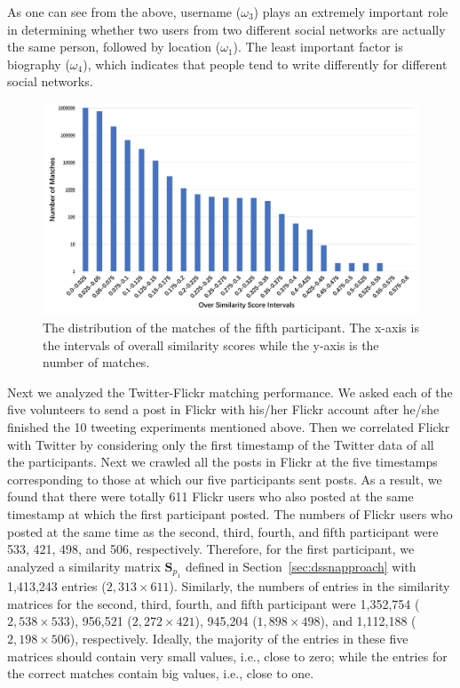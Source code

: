 \documentclass[letterpaper,12pt]{article}
\begin{document}
As one can see from the above, username ($\omega_{3}$) plays an extremely important role in determining whether two users from two different social networks are actually the same person, followed by location ($\omega_{1}$).  The least important factor is biography ($\omega_{4}$), which indicates that people tend to write differently for different social networks.

\begin{figure}[t]
  \includegraphics[width=\textwidth]{SN-SN-match.pdf}
  \caption{The distribution of the matches of the fifth participant. The x-axis is the intervals of overall similarity scores while the y-axis is the number of matches.}
  \label{fig:sn-sn-match}
\end{figure}

Next we analyzed the Twitter-Flickr matching performance. We asked each of the five volunteers to send a post in Flickr with his/her Flickr account after he/she finished the 10 tweeting experiments mentioned above. Then we correlated Flickr with Twitter by considering only the first timestamp of the Twitter data of all the participants. %
Next we crawled all the posts in Flickr at the five timestamps corresponding to those at which our five participants sent posts. As a result, we found that there were totally 611 Flickr users who also posted at the same timestamp at which the first participant posted. The numbers of Flickr users who posted at the same time as the second, third, fourth, and fifth participant were 533, 421, 498, and 506, respectively. Therefore, for the first participant, we analyzed a similarity matrix $\boldsymbol{S}_{p_1}$ defined in Section~\ref{sec:dssnapproach} with 1,413,243 entries ($2,313\times 611$). Similarly, the numbers of entries in the similarity matrices for the second, third, fourth, and fifth participant were 1,352,754 ($2,538\times 533$), 956,521 ($2,272\times 421$), 945,204 ($1,898\times 498$), and 1,112,188 ($2,198\times 506$), respectively. Ideally, the majority of the entries in these five matrices should contain very small values,  i.e., close to zero; while the entries for the  correct matches contain big values, i.e., close to one.
\end{document}
